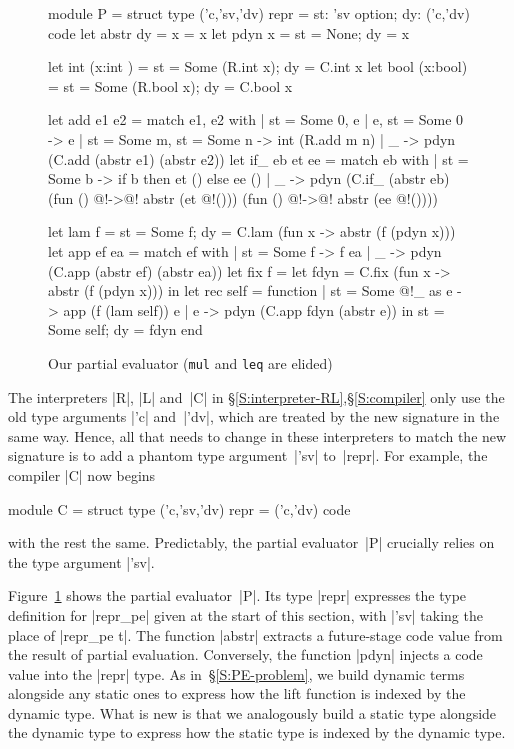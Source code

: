 \begin{figure}
\begin{floatrule}
\begin{code2}[commandchars=\@\[\]]
module P = struct
  type ('c,'sv,'dv) repr = {st: 'sv option; dy: ('c,'dv) code}
  let abstr {dy = x} = x
  let pdyn x = {st = None; dy = x}

  let int  (x:int ) = {st = Some (R.int  x); dy = C.int  x}
  let bool (x:bool) = {st = Some (R.bool x); dy = C.bool x}

  let add e1 e2 = match e1, e2 with
                  | {st = Some 0}, e | e, {st = Some 0} -> e
                  | {st = Some m}, {st = Some n} -> int (R.add m n)
                  | _ -> pdyn (C.add (abstr e1) (abstr e2))
  let if_ eb et ee = match eb with
                     | {st = Some b} -> if b then et () else ee ()
                     | _ -> pdyn (C.if_ (abstr eb) (fun () @!->@! abstr (et @!()))
                                                   (fun () @!->@! abstr (ee @!())))

  let lam f = {st = Some f; dy = C.lam (fun x -> abstr (f (pdyn x)))}
  let app ef ea = match ef with
                  | {st = Some f} -> f ea
                  | _ -> pdyn (C.app (abstr ef) (abstr ea))
  let fix f = let fdyn = C.fix (fun x -> abstr (f (pdyn x)))
              in let rec self = function
                                | {st = Some @!_} as e -> app (f (lam self)) e
                                | e -> pdyn (C.app fdyn (abstr e))
                 in {st = Some self; dy = fdyn}
end
\end{code2}
\end{floatrule}
\caption{Our partial evaluator (\texttt{mul} and \texttt{leq}
  are elided)}
\label{fig:pe}
\end{figure}

The interpreters |R|, |L| and~|C| in \S\ref{S:interpreter-RL},\S\ref{S:compiler}
only use the old
type arguments |'c| and~|'dv|, which are treated by the new signature
in the same way.  Hence, all that needs to change in these interpreters
to match the new signature is to add a phantom type
argument~|'sv| to~|repr|.
For example, the compiler |C| now begins
\begin{code}
module C = struct
  type ('c,'sv,'dv) repr = ('c,'dv) code
\end{code}
with the rest the same.
Predictably, the partial evaluator~|P| crucially relies on the type argument
|'sv|.

Figure~\ref{fig:pe} shows the partial evaluator~|P|.
Its type |repr| expresses the type definition for |repr_pe| given
at the start of this section, with |'sv| taking the place of |repr_pe t|.
The function |abstr|
extracts a future-stage code value from the result of
partial evaluation.  Conversely, the function |pdyn| injects a
code value into the |repr| type. As
in~\S\ref{S:PE-problem}, we build dynamic terms alongside
any static ones to express how the lift function is indexed
by the dynamic type.  What is new is that we analogously
build a static type alongside the dynamic type to express
how the static type is indexed by the dynamic type.

